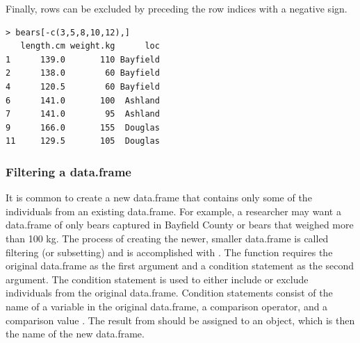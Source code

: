\documentclass[10pt,openany]{book}\usepackage[]{graphicx}\usepackage[]{color}
\makeatletter
\newenvironment{kframe}{%
 \def\at@end@of@kframe{}%
 \ifinner\ifhmode%
  \def\at@end@of@kframe{\end{minipage}}%
  \begin{minipage}{\columnwidth}%
 \fi\fi%
 \def\FrameCommand##1{\hskip\@totalleftmargin \hskip-\fboxsep
 \colorbox{shadecolor}{##1}\hskip-\fboxsep
     \hskip-\linewidth \hskip-\@totalleftmargin \hskip\columnwidth}%
 \MakeFramed {\advance\hsize-\width
   \@totalleftmargin\z@ \linewidth\hsize
   \@setminipage}}%
 {\par\unskip\endMakeFramed%
 \at@end@of@kframe}
\newenvironment{knitrout}{}{} %
\makeatother
\begin{document}
Finally, rows can be excluded by preceding the row indices with a negative sign.
\begin{knitrout}
\color{fgcolor}\begin{kframe}
\begin{verbatim}
> bears[-c(3,5,8,10,12),]
   length.cm weight.kg      loc
1      139.0       110 Bayfield
2      138.0        60 Bayfield
4      120.5        60 Bayfield
6      141.0       100  Ashland
7      141.0        95  Ashland
9      166.0       155  Douglas
11     129.5       105  Douglas
\end{verbatim}
\end{kframe}
\end{knitrout}

\vspace{-12pt}
\subsubsection{Filtering a data.frame}  \label{sect:RSubsetdf}
\vspace{-12pt}
It is common to create a new data.frame that contains only some of the individuals from an existing data.frame.  For example, a researcher may want a data.frame of only bears captured in Bayfield County or bears that weighed more than 100 kg.  The process of creating the newer, smaller data.frame is called filtering (or subsetting) and is accomplished with .  The  function requires the original data.frame as the first argument and a condition statement as the second argument.  The condition statement is used to either include or exclude individuals from the original data.frame.  Condition statements consist of the name of a variable in the original data.frame, a comparison operator, and a comparison value .  The result from  should be assigned to an object, which is then the name of the new data.frame.

\end{document}
